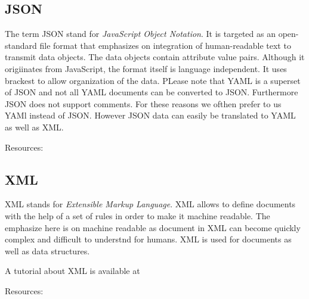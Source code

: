 \subsection{JSON}

The term JSON stand for \emph{JavaScript Object Notation}. It is
targeted as an open-standard file format that emphasizes on
integration of human-readable text to transmit data objects.  The data
objects contain attribute value pairs. Although it origiinates from
JavaScript, the format itself is language independent. It uses
brackest to allow organization of the data. PLease note that YAML is a
superset of JSON and not all YAML documents can be converted to
JSON. Furthermore JSON does not support comments. For these reasons we
ofthen prefer to us YAMl instead of JSON. However JSON data can easily
be translated to YAML as well as XML.

Resources:



\subsection{XML}

XML stands for \emph{Extensible Markup Language}. XML allows to define
documents with the help of a set of rules in order to make it machine
readable. The emphasize here is on machine readable as document in XML can become
quickly complex and difficult to understnd for humans. XML is used for
documents as well as data structures.

A tutorial about XML is available at 


Resources:

